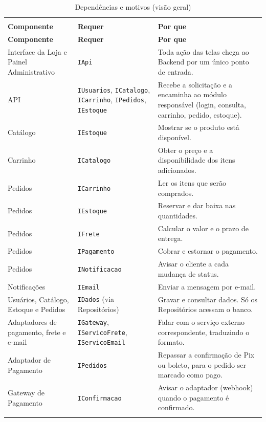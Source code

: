 \documentclass[12pt,a4paper]{article}
\begin{document}
{\small
{\setlength{\arrayrulewidth}{0.3pt}\renewcommand{\arraystretch}{1.15}
\begin{xltabular}{\textwidth}{>{\raggedright\arraybackslash}p{3.6cm}|>{\raggedright\arraybackslash}p{3.8cm}|>{\raggedright\arraybackslash}X}
\caption{Dependências e motivos (visão geral)}\\
\toprule{}
\textbf{Componente} & \textbf{Requer} & \textbf{Por que}\\ \midrule{}
\endfirsthead
{}\toprule{}
\textbf{Componente} & \textbf{Requer} & \textbf{Por que}\\ \midrule{}
\endhead
\endlastfoot
Interface da Loja e Painel Administrativo & \texttt{IApi} & Toda ação das telas chega ao Backend por um único ponto de entrada. \\ \hline
API & \texttt{IUsuarios}, \texttt{ICatalogo}, \texttt{ICarrinho}, \texttt{IPedidos}, \texttt{IEstoque} & Recebe a solicitação e a encaminha ao módulo responsável (login, consulta, carrinho, pedido, estoque). \\ \hline
Catálogo & \texttt{IEstoque} & Mostrar se o produto está disponível. \\ \hline
Carrinho & \texttt{ICatalogo} & Obter o preço e a disponibilidade dos itens adicionados. \\ \hline
Pedidos & \texttt{ICarrinho} & Ler os itens que serão comprados. \\ \hline
Pedidos & \texttt{IEstoque} & Reservar e dar baixa nas quantidades. \\ \hline
Pedidos & \texttt{IFrete} & Calcular o valor e o prazo de entrega. \\ \hline
Pedidos & \texttt{IPagamento} & Cobrar e estornar o pagamento. \\ \hline
Pedidos & \texttt{INotificacao} & Avisar o cliente a cada mudança de status. \\ \hline
Notificações & \texttt{IEmail} & Enviar a mensagem por e-mail. \\ \hline
Usuários, Catálogo, Estoque e Pedidos & \texttt{IDados} (via Repositórios) & Gravar e consultar dados. Só os Repositórios acessam o banco. \\ \hline
Adaptadores de pagamento, frete e e-mail & \texttt{IGateway}, \texttt{IServicoFrete}, \texttt{IServicoEmail} & Falar com o serviço externo correspondente, traduzindo o formato. \\ \hline
Adaptador de Pagamento & \texttt{IPedidos} & Repassar a confirmação de Pix ou boleto, para o pedido ser marcado como pago. \\ \hline
Gateway de Pagamento & \texttt{IConfirmacao} & Avisar o adaptador (webhook) quando o pagamento é confirmado. \\ \bottomrule
\end{xltabular}}}
\end{document}
